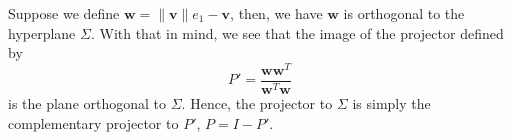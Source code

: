 \documentclass[
]{article}
\theoremstyle{definition}
\theoremstyle{definition}
\begin{document}
Suppose we define \(\mathbf{w} = \|\mathbf{v}\| e_1 - \mathbf{v}\),
then, we have \(\mathbf{w}\) is orthogonal to the hyperplane \(\Sigma\).
With that in mind, we see that the image of the projector defined by
\[P' = \frac{\mathbf{w} \mathbf{w}^T}{\mathbf{w}^T \mathbf{w}}\] is the
plane orthogonal to \(\Sigma\). Hence, the projector to \(\Sigma\) is
simply the complementary projector to \(P'\), \(P = I - P'\).

\begin{center}


\begin{tikzpicture}[x=0.75pt,y=0.75pt,yscale=-1,xscale=1]


\end{tikzpicture}
\end{center}
\end{document}
